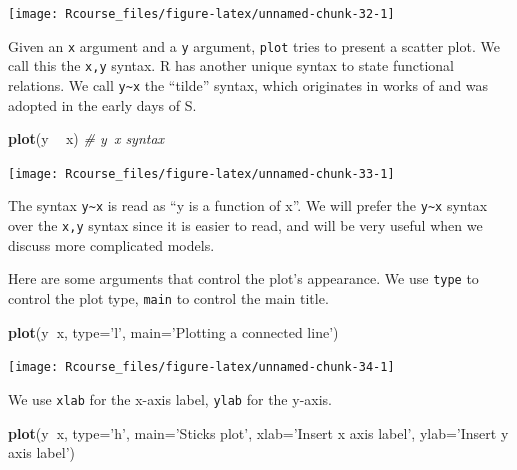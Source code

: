 \documentclass[]{book}
\newenvironment{Shaded}{\begin{snugshade}}{\end{snugshade}}
\newcommand{\KeywordTok}[1]{\textcolor[rgb]{0.13,0.29,0.53}{\textbf{#1}}}
\newcommand{\DataTypeTok}[1]{\textcolor[rgb]{0.13,0.29,0.53}{#1}}
\newcommand{\StringTok}[1]{\textcolor[rgb]{0.31,0.60,0.02}{#1}}
\newcommand{\CommentTok}[1]{\textcolor[rgb]{0.56,0.35,0.01}{\textit{#1}}}
\newcommand{\OperatorTok}[1]{\textcolor[rgb]{0.81,0.36,0.00}{\textbf{#1}}}
\newcommand{\NormalTok}[1]{#1}
\theoremstyle{definition}
\theoremstyle{definition}
\theoremstyle{definition}
\theoremstyle{remark}
\begin{document}
\texttt{[image: Rcourse\_files/figure-latex/unnamed-chunk-32-1]}

Given an \texttt{x} argument and a \texttt{y} argument, \texttt{plot}
tries to present a scatter plot. We call this the \texttt{x,y} syntax. R
has another unique syntax to state functional relations. We call
\texttt{y\textasciitilde{}x} the ``tilde'' syntax, which originates in
works of \citet{wilkinson1973symbolic} and was adopted in the early days
of S.

\begin{Shaded}
\begin{Highlighting}[]
\KeywordTok{plot}\NormalTok{(y }\OperatorTok{~}\StringTok{ }\NormalTok{x) }\CommentTok{# y~x syntax }
\end{Highlighting}
\end{Shaded}

\texttt{[image: Rcourse\_files/figure-latex/unnamed-chunk-33-1]}

The syntax \texttt{y\textasciitilde{}x} is read as ``y is a function of
x''. We will prefer the \texttt{y\textasciitilde{}x} syntax over the
\texttt{x,y} syntax since it is easier to read, and will be very useful
when we discuss more complicated models.

Here are some arguments that control the plot's appearance. We use
\texttt{type} to control the plot type, \texttt{main} to control the
main title.

\begin{Shaded}
\begin{Highlighting}[]
\KeywordTok{plot}\NormalTok{(y}\OperatorTok{~}\NormalTok{x, }\DataTypeTok{type=}\StringTok{'l'}\NormalTok{, }\DataTypeTok{main=}\StringTok{'Plotting a connected line'}\NormalTok{) }
\end{Highlighting}
\end{Shaded}

\texttt{[image: Rcourse\_files/figure-latex/unnamed-chunk-34-1]}

We use \texttt{xlab} for the x-axis label, \texttt{ylab} for the y-axis.

\begin{Shaded}
\begin{Highlighting}[]
\KeywordTok{plot}\NormalTok{(y}\OperatorTok{~}\NormalTok{x, }\DataTypeTok{type=}\StringTok{'h'}\NormalTok{, }\DataTypeTok{main=}\StringTok{'Sticks plot'}\NormalTok{, }\DataTypeTok{xlab=}\StringTok{'Insert x axis label'}\NormalTok{, }\DataTypeTok{ylab=}\StringTok{'Insert y axis label'}\NormalTok{) }
\end{Highlighting}
\end{Shaded}
\end{document}
